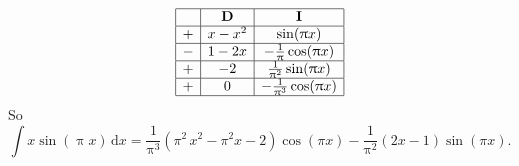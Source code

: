 \documentclass[12pt,fleqn,answers]{exam}
\begin{document}
\begin{questions}
\begin{equation*}
    \begin{array}{|c|c|c|} \hline 
         & \textbf{D} & \textbf{I}  \\ \hline 
         + &  x - x^2 & \sin(\uppi x) \\ \hline 
         - &  1-2x  &  - \frac{1}{\uppi} \cos(\uppi x)  \\ \hline 
         + &  -2    &  \frac{1}{\uppi^2} \sin(\uppi x)  \\ \hline
         + &  0    &  -\frac{1}{\uppi^3} \cos(\uppi x)  \\ \hline
   \end{array}
\end{equation*}
So 
\begin{equation*}
    \int x  \sin (\uppi x) \, \mathrm{d} x = \frac{1}{\uppi^3} \left( {{\ensuremath{\pi} }^{2}}\, {{x}^{2}}- {{\ensuremath{\pi} }^{2}} x-2\right)  \cos{\left( \ensuremath{\pi}  x\right) }- \frac{1}{\uppi^2}   \left( 2 x-1\right)  \sin{\left( \ensuremath{\pi}  x\right) }.
\end{equation*}
\end{questions}
\end{document}
